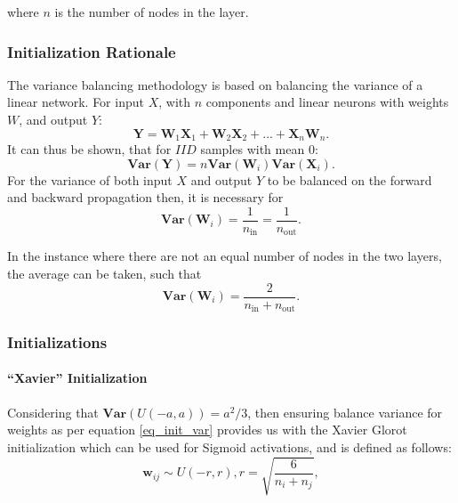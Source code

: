 \documentclass[a4paper,11pt,oneside]{article}
\newcommand{\Var}{\mathbf{Var}}
\theoremstyle{plain}
\theoremstyle{definition}
\begin{document}
	where $n$ is the number of nodes in the layer.
	
	\subsubsection{Initialization Rationale}
	
	The variance balancing methodology is based on balancing the variance of a linear network. For input $X$, with $n$ components and linear neurons with weights $W$, and output $Y$:
	\begin{equation}
	\mathbf{Y} = \mathbf{W}_1\mathbf{X}_1 + \mathbf{W}_2\mathbf{X}_2 + ... + \mathbf{X}_n\mathbf{W}_n .
	\end{equation}
	It can thus be shown, that for $IID$ samples with mean $0$:
	\begin{equation}
	\mathbf{\Var(Y)} = n{\Var}(\mathbf{W}_i){\Var}(\mathbf{X}_i) .
	\end{equation}
	For the variance of both input $X$ and output $Y$ to be balanced on the forward and backward propagation then, it is necessary for
	\begin{equation}
	{\Var}(\mathbf{W}_i) = \frac{1}{n_{\mathrm{in}}}= \frac{1}{n_{\mathrm{out}}} .
	\end{equation}
	
	In the instance where there are not an equal number of nodes in the two layers, the average can be taken, such that
	\begin{equation}\label{eq_init_var}
	{\Var}(\mathbf{W}_i) = \frac{2}{n_{\mathrm{in}} + n_{\mathrm{out}}} .
	\end{equation}
	
	\subsubsection{Initializations}
	
	\paragraph{``Xavier'' Initialization} Considering that  $\Var(U(-a, a)) = a^2/3$, then ensuring balance variance for weights as per equation \eqref{eq_init_var} provides us with the Xavier Glorot initialization \citep{Glorot} which can be used for Sigmoid activations, and is defined as follows:
	\begin{equation}
	\mathbf{w}_{ij} \sim U(-r, r), r = \sqrt{\frac{6}{n_i + n_j}} ,
	\end{equation}
	
\end{document}

